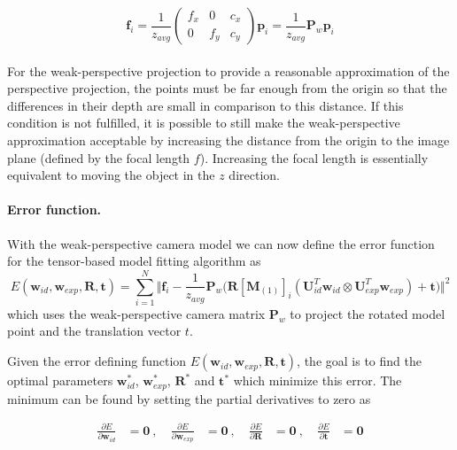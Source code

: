 \documentclass[11pt,a4paper,twoside]{report}
\begin{document}
\begin{equation}\label{eq:fit9}
 \mathbf{f}_i = \frac{1}{z_{avg}}\begin{pmatrix}f_x&0&c_x\\0&f_y&c_y\end{pmatrix}\mathbf{p}_i
    = \frac{1}{z_{avg}}\mathbf{P}_w\mathbf{p}_i
\end{equation}\\
For the weak-perspective projection to provide a reasonable approximation of the
perspective projection, the points must be far enough from the origin so that
the differences in their depth are small in comparison to this distance. If this condition is not fulfilled, it is
possible to still make the weak-perspective approximation acceptable by
increasing the distance from the origin to the
image plane (defined by the focal length $f$). Increasing the focal length
is essentially equivalent to moving the object in the $z$ direction.


\paragraph{Error function.} With the weak-perspective camera model we can now define the error function for
the tensor-based model fitting algorithm as
\begin{equation}\label{eq:fit10}
E(\mathbf{w}_{id}, \mathbf{w}_{exp}, \mathbf{R}, \mathbf{t}) = \sum_{i=1}^N \Big\Vert\mathbf{f}_i - \frac{1}{z_{avg}}\mathbf{P}_w\Big(\mathbf{R}[\mathbf{M}_{(1)}]_{i}(\mathbf{U}_{id}^T\mathbf{w}_{id} \otimes
\mathbf{U}_{exp}^T\mathbf{w}_{exp}) + \mathbf{t}\Big)\Big\Vert^2
\end{equation}
which uses the weak-perspective camera matrix $\mathbf{P}_w$ to project the
rotated model point and the translation vector $t$. 

Given the error defining function $E(\mathbf{w}_{id}, \mathbf{w}_{exp}, \mathbf{R},
\mathbf{t})$, the goal is to find the optimal parameters $\mathbf{w}_{id}^*$,
$\mathbf{w}_{exp}^*$, $\mathbf{R}^*$ and
$\mathbf{t}^*$ which minimize this
error. The minimum can be found by setting the partial derivatives to zero as

\begin{align}\label{eq:fit11}
\frac{\partial E}{\partial \mathbf{w}_{id}} &= \mathbf{0} \: \mathrm{, } \: & \frac{\partial
  E}{\partial \mathbf{w}_{exp}} &= \mathbf{0}  \: \mathrm{, } \:  & \frac{\partial E}{\partial
  \mathbf{R}} &= \mathbf{0}  \: \mathrm{, } \:  & \frac{\partial E}{\partial \mathbf{t}} &= \mathbf{0}
\end{align}
\end{document}
